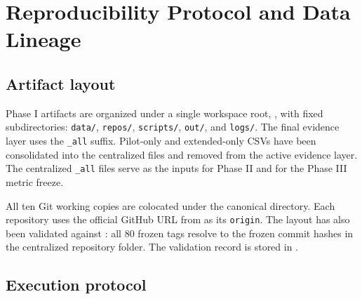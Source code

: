 \section{Reproducibility Protocol and Data Lineage}
\label{sec:reproducibility}

\subsection{Artifact layout}
\label{sec:repro_layout}

Phase I artifacts are organized under a single workspace root, ,
with fixed subdirectories: \texttt{data/}, \texttt{repos/}, \texttt{scripts/}, \texttt{out/}, and
\texttt{logs/}. The final evidence layer uses the \texttt{\_all} suffix. Pilot-only and extended-only
CSVs have been consolidated into the centralized files and removed from the active evidence layer.
The centralized \texttt{\_all} files serve as the inputs for Phase II and for the Phase III metric freeze.

All ten Git working copies are colocated under the canonical  directory. Each repository
uses the official GitHub URL from  as its \texttt{origin}. The layout
has also been validated against : all 80 frozen tags resolve to the frozen
commit hashes in the centralized repository folder. The validation record is stored in
.

\subsection{Execution protocol}
\label{sec:repro_execution}

